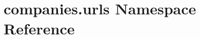 \hypertarget{namespacecompanies_1_1urls}{\section{companies.\-urls Namespace Reference}
\label{namespacecompanies_1_1urls}
}
